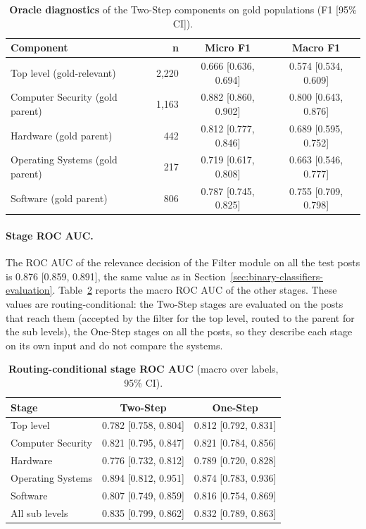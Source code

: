 \begin{table}
    \centering
    \caption{\textbf{Oracle diagnostics} of the Two-Step components on gold populations (F1 [95{\%} CI]).}
    \label{tab:oracle}
    \small
    \begin{tabular}{lrcc}
        \hline
        \textbf{Component} & \textbf{n} & \textbf{Micro F1} & \textbf{Macro F1} \\
        \hline
        Top level (gold-relevant) & 2,220 & 0.666 [0.636, 0.694] & 0.574 [0.534, 0.609] \\
        Computer Security (gold parent) & 1,163 & 0.882 [0.860, 0.902] & 0.800 [0.643, 0.876] \\
        Hardware (gold parent) & 442 & 0.812 [0.777, 0.846] & 0.689 [0.595, 0.752] \\
        Operating Systems (gold parent) & 217 & 0.719 [0.617, 0.808] & 0.663 [0.546, 0.777] \\
        Software (gold parent) & 806 & 0.787 [0.745, 0.825] & 0.755 [0.709, 0.798] \\
        \hline
    \end{tabular}
\end{table}

\paragraph{Stage ROC AUC.} The ROC AUC of the relevance decision of the Filter module on all the test posts is 0.876 [0.859, 0.891], the same value as in Section~\ref{sec:binary-classifiers-evaluation}. Table~\ref{tab:stage-auc} reports the macro ROC AUC of the other stages. These values are routing-conditional: the Two-Step stages are evaluated on the posts that reach them (accepted by the filter for the top level, routed to the parent for the sub levels), the One-Step stages on all the posts, so they describe each stage on its own input and do not compare the systems.

\begin{table}
    \centering
    \caption{\textbf{Routing-conditional stage ROC AUC} (macro over labels, 95{\%} CI).}
    \label{tab:stage-auc}
    \small
    \begin{tabular}{lcc}
        \hline
        \textbf{Stage} & \textbf{Two-Step} & \textbf{One-Step} \\
        \hline
        Top level & 0.782 [0.758, 0.804] & 0.812 [0.792, 0.831] \\
        Computer Security & 0.821 [0.795, 0.847] & 0.821 [0.784, 0.856] \\
        Hardware & 0.776 [0.732, 0.812] & 0.789 [0.720, 0.828] \\
        Operating Systems & 0.894 [0.812, 0.951] & 0.874 [0.783, 0.936] \\
        Software & 0.807 [0.749, 0.859] & 0.816 [0.754, 0.869] \\
        All sub levels & 0.835 [0.799, 0.862] & 0.832 [0.789, 0.863] \\
        \hline
    \end{tabular}
\end{table}


